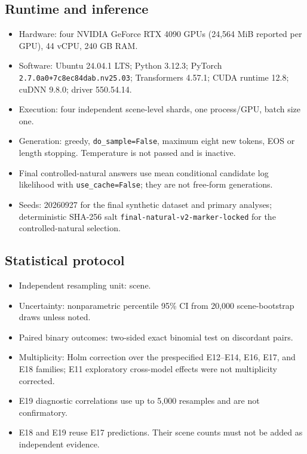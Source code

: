 \documentclass[10pt,twocolumn,letterpaper]{article}
\begin{document}
\subsection{Runtime and inference}

\begin{itemize}[leftmargin=*]
    \item Hardware: four NVIDIA GeForce RTX 4090 GPUs (24,564 MiB reported per GPU), 44 vCPU, 240 GB RAM.
    \item Software: Ubuntu 24.04.1 LTS; Python 3.12.3; PyTorch \texttt{2.7.0a0+7c8ec84dab.nv25.03}; Transformers 4.57.1; CUDA runtime 12.8; cuDNN 9.8.0; driver 550.54.14.
    \item Execution: four independent scene-level shards, one process/GPU, batch size one.
    \item Generation: greedy, \texttt{do\_sample=False}, maximum eight new tokens, EOS or length stopping.  Temperature is not passed and is inactive.
    \item Final controlled-natural answers use mean conditional candidate log likelihood with \texttt{use\_cache=False}; they are not free-form generations.
    \item Seeds: 20260927 for the final synthetic dataset and primary analyses; deterministic SHA-256 salt \texttt{final-natural-v2-marker-locked} for the controlled-natural selection.
\end{itemize}

\subsection{Statistical protocol}

\begin{itemize}[leftmargin=*]
    \item Independent resampling unit: scene.
    \item Uncertainty: nonparametric percentile 95\% CI from 20,000 scene-bootstrap draws unless noted.
    \item Paired binary outcomes: two-sided exact binomial test on discordant pairs.
    \item Multiplicity: Holm correction over the prespecified E12--E14, E16, E17, and E18 families; E11 exploratory cross-model effects were not multiplicity corrected.
    \item E19 diagnostic correlations use up to 5,000 resamples and are not confirmatory.
    \item E18 and E19 reuse E17 predictions.  Their scene counts must not be added as independent evidence.
\end{itemize}
\end{document}
